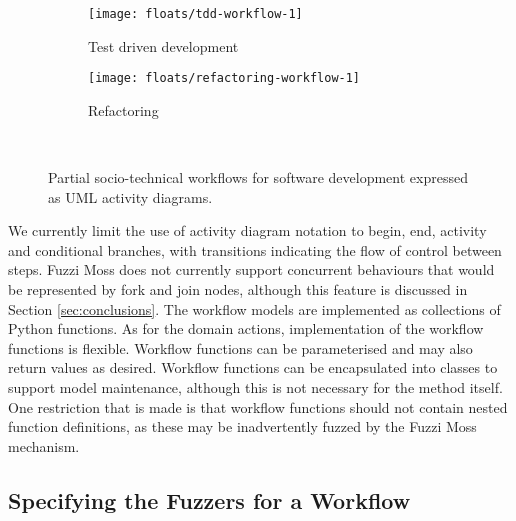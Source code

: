 \documentclass{sig-alternate}
\begin{document}
\begin{figure*}
  \centering

  \begin{subfigure}[b]{.45\linewidth}
    \centering
    \texttt{[image: floats/tdd-workflow-1]}

    \caption{Test driven development}
    \label{fig:workflow-tdd}
  \end{subfigure}
  \begin{subfigure}[b]{.45\linewidth}
    \centering
    \texttt{[image: floats/refactoring-workflow-1]}
    
    \caption{Refactoring}
    \label{fig:workflow-refactoring}
  \end{subfigure}
  
  \

  \caption{Partial socio-technical workflows for software development expressed as UML activity diagrams.}

  \label{fig:workflow-partial}
\end{figure*}

We currently limit the use of activity diagram notation to begin, end, activity and conditional branches, with
transitions indicating the flow of control between steps.  Fuzzi Moss does not currently support concurrent behaviours
that would be represented by fork and join nodes, although this feature is discussed in Section \ref{sec:conclusions}.
The workflow models are implemented as collections of Python functions.  As for the domain actions, implementation of
the workflow functions is flexible. Workflow functions can be parameterised and may also return values as desired.
Workflow functions can be encapsulated into classes to support model maintenance, although this is not necessary for the
method itself.  One restriction that is made is that workflow functions should not contain nested function definitions,
as these may be inadvertently fuzzed by the Fuzzi Moss mechanism.


\subsection{Specifying the Fuzzers for a Workflow}

\end{document}
